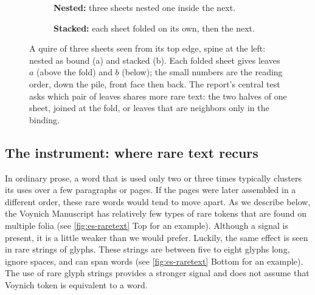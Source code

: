 \documentclass[11pt,a4paper]{article}
\newcommand{\qpitch}{0.6}      %
\newcommand{\qarm}{1.9}        %
\newcommand{\qband}{5pt}       %
\newcommand{\qleaf}[4]{%
  \pgfmathsetmacro{\y}{-#1*\qpitch}
  \pgfmathtruncatemacro{\pv}{#4+1}
  \node[anchor=south,font=\sffamily\tiny,color=ink2,inner sep=0.5pt] at (\qarm-0.16,\y+0.09) {#4};
  \node[anchor=north,font=\sffamily\tiny,color=muted,inner sep=0.5pt] at (\qarm-0.52,\y-0.09) {\pv};
  \node[anchor=west,font=\sffamily\scriptsize,color=black!80] at (\qarm+0.08,\y) {#2$#3$};
  \coordinate (leaf#2#3) at (\qarm+0.55,\y);
}
\newcommand{\qsheet}[3]{%
  \pgfmathsetmacro{\r}{(#1-#2)/2}
  \draw[line width=\qband,#3,line cap=butt] (\qarm,#1) -- (0,#1) arc[start angle=90,end angle=270,radius=\r] -- (\qarm,#2);
}
\newcommand{\qnested}[1]{%
  \foreach \s in {1,...,#1}{
    \pgfmathtruncatemacro{\ia}{\s-1}\pgfmathtruncatemacro{\ib}{2*#1-\s}
    \qsheet{-\ia*\qpitch}{-\ib*\qpitch}{sheet\s}
    \pgfmathtruncatemacro{\pa}{2*\ia+1}\pgfmathtruncatemacro{\pb}{2*\ib+1}
    \qleaf{\ia}{\s}{a}{\pa}\qleaf{\ib}{\s}{b}{\pb}
  }
}
\newcommand{\qstacked}[1]{%
  \foreach \s in {1,...,#1}{
    \pgfmathtruncatemacro{\ia}{2*\s-2}\pgfmathtruncatemacro{\ib}{2*\s-1}
    \qsheet{-\ia*\qpitch}{-\ib*\qpitch}{sheet\s}
    \pgfmathtruncatemacro{\pa}{2*\ia+1}\pgfmathtruncatemacro{\pb}{2*\ib+1}
    \qleaf{\ia}{\s}{a}{\pa}\qleaf{\ib}{\s}{b}{\pb}
  }
}
\newcommand{\qreadarrow}[1]{%
  \pgfmathsetmacro{\yb}{-(#1-1)*\qpitch-0.22}
  \draw[->,muted,>={Stealth[length=3pt]},line width=0.5pt] (\qarm+0.62,0.22) -- (\qarm+0.62,\yb);
  \node[anchor=north west,color=ink2,font=\sffamily\tiny,align=left,inner sep=1pt] at (\qarm+0.5,\yb-0.02) {reading order};
}
\newcommand{\qfoldmark}[2]{%
  \draw[stackedc,line width=1.1pt] (0,#1+#2) arc[start angle=90,end angle=270,radius=#2];
}
\newcommand{\qfoldlabel}[3]{%
  \node[anchor=north west,align=left,font=\sffamily\tiny,color=stackedc!80!black,text width=3.1cm,inner sep=1pt] at (#1,#2) {#3};
}
\newcommand{\qbracket}[6]{%
  \draw[#3,line width=0.9pt] ($(#1)+(#4,0.13)$) -- ($(#1)+(#4+0.12,0.13)$) -- ($(#2)+(#4+0.12,-0.13)$) -- ($(#2)+(#4,-0.13)$);
  \node[anchor=west,align=left,font=\sffamily\tiny,color=#3!80!black,text width=2.35cm,inner sep=1pt] at ($(#1)+(#4+0.2,#5)$) {#6};
}
\newcommand{\qfacecallout}{%
  \draw[muted,line width=0.4pt] (\qarm-1.05,0.36) -- (\qarm-0.45,0.11);
  \node[anchor=east,font=\sffamily\tiny,color=ink2,inner sep=1pt] at (\qarm-1.05,0.36) {front face ($r$)};
  \draw[muted,line width=0.4pt] (\qarm-1.35,-0.3) -- (\qarm-0.8,-0.11);
  \node[anchor=east,font=\sffamily\tiny,color=ink2,inner sep=1pt] at (\qarm-1.35,-0.3) {back face ($v$)};
}
\newcommand{\pv}{p}
\begin{document}
\begin{figure}[htbp]
\centering
\begin{subfigure}[t]{0.48\textwidth}
\centering
{}
\caption{\textbf{Nested:} three sheets nested one inside the next.}
\label{fig:es-schematic-a}
\end{subfigure}\hfill
\begin{subfigure}[t]{0.48\textwidth}
\centering
{}
\caption{\textbf{Stacked:} each sheet folded on its own, then the next.}
\label{fig:es-schematic-b}
\end{subfigure}
\caption{A quire of three sheets seen from its top edge, spine at the left: nested as bound (a) and stacked (b). Each folded sheet gives leaves $a$ (above the fold) and $b$ (below); the small numbers are the reading order, down the pile, front face then back. The report's central test asks which pair of leaves shares more rare text: the two halves of one sheet, joined at the fold, or leaves that are neighbors only in the binding.}
\label{fig:es-schematic}
\end{figure}

\subsection*{The instrument: where rare text recurs}
In ordinary prose, a word that is used only two or three times typically clusters its uses over a few paragraphs or pages. If the pages were later assembled in a different order, these rare words would tend to move apart. As we describe below, the Voynich Manuscript has relatively few types of rare tokens that are found on multiple folia (see \cref{fig:es-raretext} Top for an example). Although a signal is present, it is a little weaker than we would prefer.  
Luckily, the same effect is seen in rare strings of glyphs. These strings are between five to eight glyphs long, ignore spaces, and can span words (see \cref{fig:es-raretext} Bottom for an example). The use of rare glyph strings provides a stronger signal and does not assume that Voynich token is equivalent to a word. 
\end{document}
